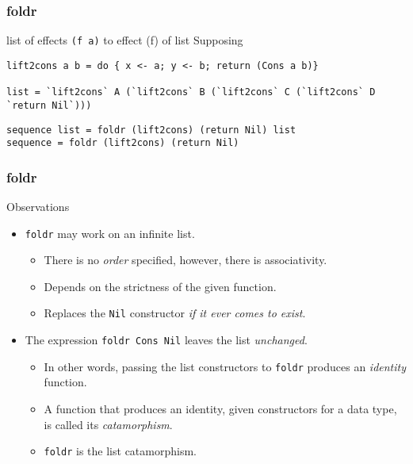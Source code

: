 \begin{frame}[fragile]
\frametitle{foldr}
\begin{block}{list of effects \lstinline{(f a)} to effect (f) of list}
Supposing
\begin{lstlisting}[style=haskell,basicstyle=\tiny\ttfamily,mathescape]
lift2cons a b = do { x <- a; y <- b; return (Cons a b)}

list = `lift2cons` A (`lift2cons` B (`lift2cons` C (`lift2cons` D `return Nil`)))
\end{lstlisting}
\end{block}
\begin{lstlisting}[style=haskell,basicstyle=\scriptsize\ttfamily,mathescape]
sequence list = foldr (lift2cons) (return Nil) list
sequence = foldr (lift2cons) (return Nil)
\end{lstlisting}
\end{frame}

\begin{frame}[fragile]
\frametitle{foldr}
\begin{block}{Observations}
\begin{itemize}
\item \lstinline[basicstyle=\ttfamily]$foldr$ may work on an infinite list.
  \begin{itemize}
  \item There is no \emph{order} specified, however, there is associativity.
  \item Depends on the strictness of the given function.
  \item Replaces the \lstinline[basicstyle=\ttfamily]$Nil$ constructor \emph{if it ever comes to exist}.
  \end{itemize}
\item The expression \lstinline[basicstyle=\ttfamily]$foldr Cons Nil$ leaves the list \emph{unchanged}.
  \begin{itemize}
  \item In other words, passing the list constructors to \lstinline[basicstyle=\ttfamily]$foldr$ produces an \emph{identity} function.
  \item A function that produces an identity, given constructors for a data type, is called its \emph{catamorphism}.
  \item \lstinline[basicstyle=\ttfamily]$foldr$ is the list catamorphism.
  \end{itemize}
\end{itemize}
\end{block}
\end{frame}
